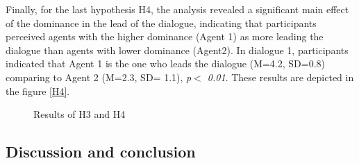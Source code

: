 \documentclass{llncs}
\begin{document}
	\par Finally, for the last hypothesis H4, the analysis revealed a significant main effect of the dominance in the lead of the dialogue, indicating that participants perceived agents with the higher dominance (Agent 1) as more leading the dialogue than agents with lower dominance (Agent2). In dialogue 1, participants indicated that Agent 1 is the one who leads the dialogue (M=4.2, SD=0.8) comparing to Agent 2 (M=2.3, SD= 1.1), \textit{p$<$ 0.01}. These results are depicted in the figure \ref{H4}.
	
	\begin{figure}[htb!]
	\setlength\fboxsep{0pt}\setlength\fboxrule{0.75pt}
	{
	\caption{Results of H3 and H4}
	
	}
	\end{figure}%
	\subsection{Discussion and conclusion}
	
\end{document}

